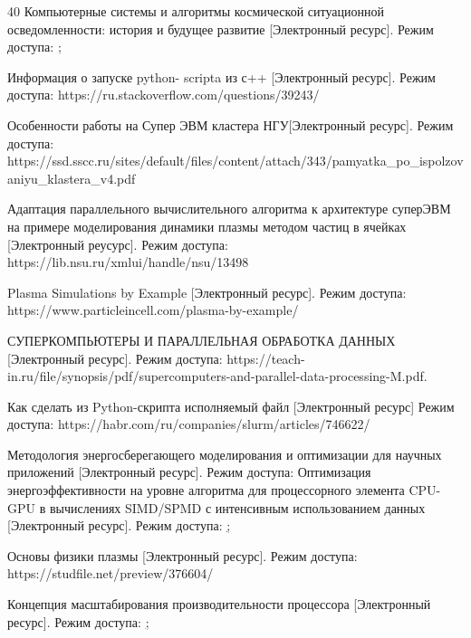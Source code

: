 \documentclass{article}
\begin{document}
\begin{thebibliography} {40}
Компьютерные системы и алгоритмы космической ситуационной осведомленности: история и будущее развитие [Электронный ресурс].
Режим доступа: \href{https://www.academia.edu/47898656/Computer_Systems_and_Algorithms_for_Space_Situational_Awareness_History_and_Future_Development};

Информация о запуске python- scripta из с++ [Электронный ресурс]. Режим доступа: https://ru.stackoverflow.com/questions/39243/

Особенности работы на Супер ЭВМ кластера НГУ[Электронный ресурс]. Режим доступа: https://ssd.sscc.ru/sites/default/files/content/attach/343/pamyatka_po_ispolzovaniyu_klastera_v4.pdf

Адаптация параллельного вычислительного алгоритма к архитектуре суперЭВМ на примере моделирования динамики плазмы методом частиц в ячейках [Электронный реусурс]. Режим доступа: https://lib.nsu.ru/xmlui/handle/nsu/13498

Plasma Simulations by Example [Электронный ресурс]. Режим доступа: https://www.particleincell.com/plasma-by-example/

СУПЕРКОМПЬЮТЕРЫ И ПАРАЛЛЕЛЬНАЯ ОБРАБОТКА
ДАННЫХ [Электронный ресурс]. Режим доступа: https://teach-in.ru/file/synopsis/pdf/supercomputers-and-parallel-data-processing-M.pdf.

Как сделать из Python-скрипта исполняемый файл [Электронный ресурс] Режим доступа: https://habr.com/ru/companies/slurm/articles/746622/

Методология энергосберегающего моделирования и оптимизации для научных приложений [Электронный ресурс].
Режим доступа: \href{https://www.semanticscholar.org/paper/E-AMOM\%3A-an-energy-aware-modeling-and-optimization-Lively-Taylor/fa10af546b3fd83df250f7d8ea5c53016c904af6}

Оптимизация энергоэффективности на уровне алгоритма для процессорного элемента CPU-GPU в вычислениях SIMD/SPMD с интенсивным использованием данных [Электронный ресурс].
Режим доступа: \href{https://www.researchgate.net/publication/220378904_Algorithm_level_power_efficiency_optimization_for_CPU-GPU_processing_element_in_data_intensive_SIMDSPMD_computing};

Основы физики плазмы [Электронный ресурс]. Режим доступа: https://studfile.net/preview/376604/

Концепция масштабирования производительности процессора [Электронный ресурс].
Режим доступа: \href{https://www.kernel.org/doc/html/latest/admin-guide/pm/cpufreq.html};


\end{thebibliography}
\end{document}
